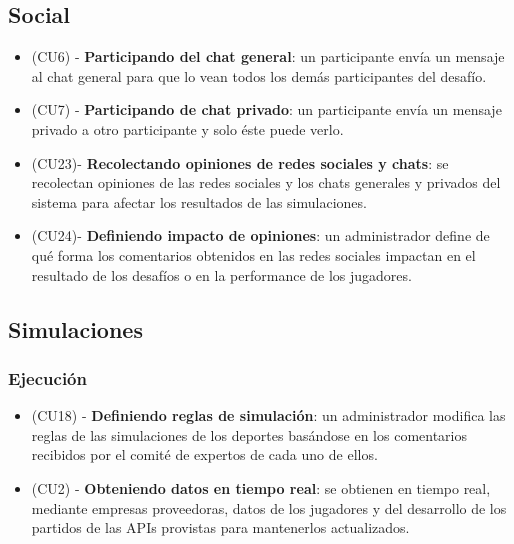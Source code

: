 \subsection{Social}
\begin{itemize}
\item (CU6) -  \textbf{Participando del chat general}: un participante envía un mensaje al chat general para que lo vean todos los demás participantes del desafío.
\item (CU7) - \textbf{Participando de chat privado}: un participante envía un mensaje privado a otro participante y solo éste puede verlo.
\item (CU23)-  \textbf{Recolectando opiniones de redes sociales y chats}: se recolectan opiniones de las redes sociales y los chats generales y privados del sistema para afectar los resultados de las simulaciones.
\item (CU24)-  \textbf{Definiendo impacto de opiniones}: un administrador define de qué forma los comentarios obtenidos en las redes sociales impactan en el resultado de los desafíos o en la performance de los jugadores.
\end{itemize}

\subsection{Simulaciones}
\subsubsection{Ejecución}
\begin{itemize}
\item (CU18) - \textbf{Definiendo reglas de simulación}: un administrador modifica las reglas de las simulaciones de los deportes basándose en los comentarios recibidos por el comité de expertos de cada uno de ellos.
\item (CU2) - \textbf{Obteniendo datos en tiempo real}: se obtienen en tiempo real, mediante empresas proveedoras, datos de los jugadores y del desarrollo de los partidos de las APIs provistas para mantenerlos actualizados. 
\end{itemize}


